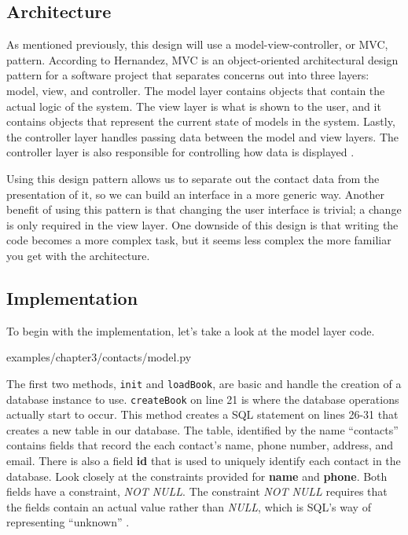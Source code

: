 \documentclass[12pt, oneside, a4paper]{book}
\begin{document}
      \subsection{Architecture}
      As mentioned previously, this design will use a model-view-controller, or MVC, pattern.
      According to Hernandez, MVC is an object-oriented architectural design pattern for a software project that separates concerns out into three layers: model, view, and controller.
      The model layer contains objects that contain the actual logic of the system.
      The view layer is what is shown to the user, and it contains objects that represent the current state of models in the system.
      Lastly, the controller layer handles passing data between the model and view layers.
      The controller layer is also responsible for controlling how data is displayed \autocite{hernandezModelViewController2021}.

      Using this design pattern allows us to separate out the contact data from the presentation of it, so we can build an interface in a more generic way.
      Another benefit of using this pattern is that changing the user interface is trivial; a change is only required in the view layer.
      One downside of this design is that writing the code becomes a more complex task, but it seems less complex the more familiar you get with the architecture.

      \subsection{Implementation}
      To begin with the implementation, let's take a look at the model layer code.

      
      {examples/chapter3/contacts/model.py}

      The first two methods, \lstinline!init! and \lstinline!loadBook!, are basic and handle the creation of a database instance to use.
      \lstinline!createBook! on line 21 is where the database operations actually start to occur.
      This method creates a SQL statement on lines 26-31 that creates a new table in our database.
      The table, identified by the name ``contacts'' contains fields that record the each contact's name, phone number, address, and email.
      There is also a field \textbf{id} that is used to uniquely identify each contact in the database.
      Look closely at the constraints provided for \textbf{name} and \textbf{phone}.
      Both fields have a constraint, \textit{NOT NULL}.
      The constraint \textit{NOT NULL} requires that the fields contain an actual value rather than \textit{NULL}, which is SQL's way of representing ``unknown'' \autocite{SQLiteSyntaxColumnconstraint}.
\end{document}
